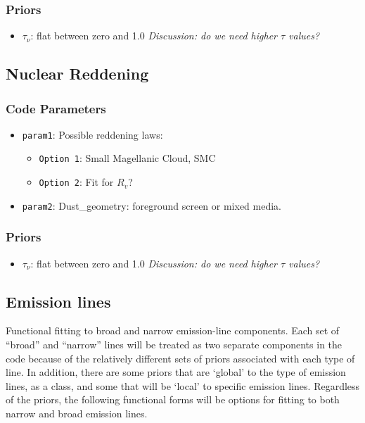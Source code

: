 \documentclass[12pt,letterpaper]{article}
\begin{document}
\subsubsection*{Priors}
  \begin{itemize}
   \item {\tt $\tau_{\nu}$}: flat between zero and 1.0 \textit{Discussion: do we need higher $\tau$ values?}
  \end{itemize}

\subsection*{Nuclear Reddening}

\subsubsection*{Code Parameters}
\begin{itemize}
    \item {\tt param1}: Possible reddening laws:
    \begin{itemize}
      \item {\tt Option 1}: Small Magellanic Cloud, SMC
      \item {\tt Option 2}: Fit for $R_v$?
    \end{itemize}
    \item {\tt param2}: Dust\_geometry: foreground screen or mixed media.
\end{itemize}

\subsubsection*{Priors}
  \begin{itemize}
   \item {\tt $\tau_{\nu}$}: flat between zero and 1.0 \textit{Discussion: do we need higher $\tau$ values?}
  \end{itemize}


\subsection*{Emission lines}
Functional fitting to broad and narrow emission-line components.  Each
set of ``broad'' and ``narrow'' lines will be treated as two separate
components in the code because of the relatively different sets of
priors associated with each type of line.  In addition, there are some
priors that are `global' to the type of emission lines, as a class, and
some that will be `local' to specific emission lines. Regardless of the
priors, the following functional forms will be options for fitting to
both narrow and broad emission lines.
\end{document}

